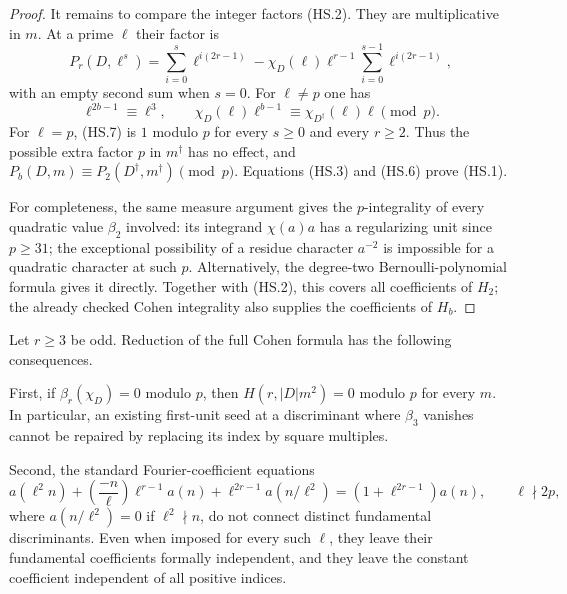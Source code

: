 \begin{proof}
It remains to compare the integer factors (HS.2).
They are multiplicative in $m$.  At a prime $\ell$ their factor is
\[
 P_r(D,\ell^s)=
 \sum_{i=0}^{s}\ell^{i(2r-1)}
   -\chi_D(\ell)\ell^{r-1}
                \sum_{i=0}^{s-1}\ell^{i(2r-1)},       \tag{HS.7}
\]
with an empty second sum when $s=0$.
For $\ell\ne p$ one has
\[
 \ell^{2b-1}\equiv\ell^3,\qquad
 \chi_D(\ell)\ell^{b-1}
      \equiv\chi_{D^\dagger}(\ell)\ell\pmod p.
                                                               \tag{HS.8}
\]
For $\ell=p$, (HS.7) is $1$ modulo $p$ for every $s\geq0$
and every $r\geq2$.  Thus the possible extra factor $p$ in
$m^\dagger$ has no effect, and
$P_b(D,m)\equiv P_2(D^\dagger,m^\dagger)\pmod p$.
Equations (HS.3) and (HS.6) prove (HS.1).

For completeness, the same measure argument gives the
$p$-integrality of every quadratic value $\beta_2$ involved:
its integrand $\chi(a)a$ has a regularizing unit since
$p\geq31$; the exceptional possibility of a residue character
$a^{-2}$ is impossible for a quadratic character at such $p$.
Alternatively, the degree-two Bernoulli-polynomial formula
gives it directly.  Together with (HS.2), this covers all
coefficients of $H_2$; the already checked Cohen integrality
also supplies the coefficients of $H_b$.
\end{proof}

\begin{proposition}
Let $r\geq3$ be odd.  Reduction of the full Cohen formula
has the following consequences.

First, if $\beta_r(\chi_D)=0$ modulo $p$, then
$H(r,|D|m^2)=0$ modulo $p$ for every $m$.
In particular, an existing first-unit seed at a discriminant
where $\beta_3$ vanishes cannot be repaired by replacing its
index by square multiples.

Second, the standard Fourier-coefficient equations
\[
 a(\ell^2n)+\left(\frac{-n}{\ell}\right)\ell^{r-1}a(n)
       +\ell^{2r-1}a(n/\ell^2)
       =(1+\ell^{2r-1})a(n),\qquad \ell\nmid2p,         \tag{HS.9}
\]
where $a(n/\ell^2)=0$ if $\ell^2\nmid n$,
do not connect distinct fundamental discriminants.
Even when imposed for every such $\ell$, they leave their
fundamental coefficients formally independent, and they leave
the constant coefficient independent of all positive indices.
\end{proposition}

